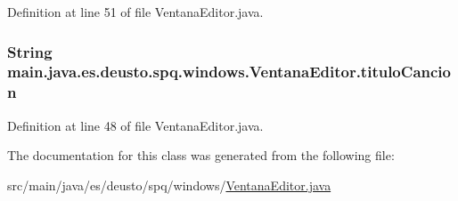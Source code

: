 Definition at line 51 of file Ventana\+Editor.\+java.

\subsubsection[{\texorpdfstring{titulo\+Cancion}{tituloCancion}}]{\setlength{\rightskip}{0pt plus 5cm}String main.\+java.\+es.\+deusto.\+spq.\+windows.\+Ventana\+Editor.\+titulo\+Cancion}\hypertarget{classmain_1_1java_1_1es_1_1deusto_1_1spq_1_1windows_1_1_ventana_editor_af24a9643b65eae249994f5859e2a3b94}{}\label{classmain_1_1java_1_1es_1_1deusto_1_1spq_1_1windows_1_1_ventana_editor_af24a9643b65eae249994f5859e2a3b94}


Definition at line 48 of file Ventana\+Editor.\+java.



The documentation for this class was generated from the following file\+:\begin{DoxyCompactItemize}
\item 
src/main/java/es/deusto/spq/windows/\hyperlink{_ventana_editor_8java}{Ventana\+Editor.\+java}\end{DoxyCompactItemize}

